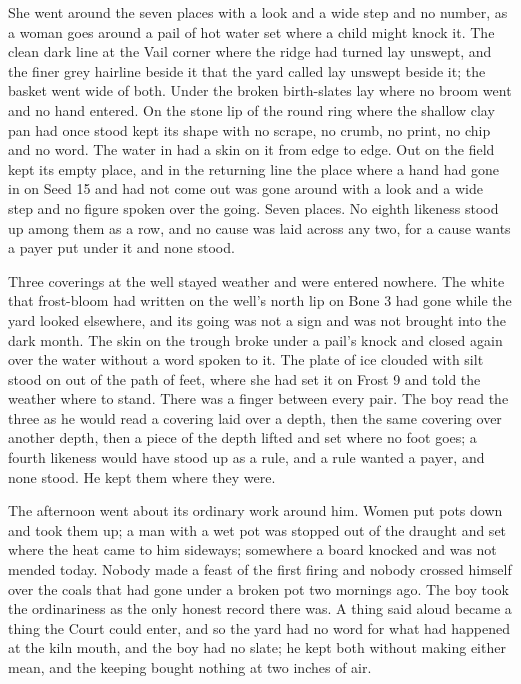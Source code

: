 She went around the seven places with a look and a wide step and no number, as a woman goes around a pail of hot water set where a child might knock it. The clean dark line at the Vail corner where the  ridge had turned lay unswept, and the finer grey hairline beside it that the yard called  lay unswept beside it; the basket went wide of both. Under  the broken birth-slates lay where no broom went and no hand entered. On the stone lip of  the round ring where the shallow clay pan had once stood kept its shape with no scrape, no crumb, no print, no chip and no word. The water in  had a skin on it from edge to edge. Out on  the field kept its empty place, and in the returning line the place where a hand had gone in on Seed 15 and had not come out was gone around with a look and a wide step and no figure spoken over the going. Seven places. No eighth likeness stood up among them as a row, and no cause was laid across any two, for a cause wants a payer put under it and none stood.

Three coverings at the well stayed weather and were entered nowhere. The white that frost-bloom had written on the well's north lip on Bone 3 had gone while the yard looked elsewhere, and its going was not a sign and was not brought into the dark month. The skin on the trough broke under a pail's knock and closed again over the water without a word spoken to it. The plate of ice clouded with silt stood on  out of the path of feet, where she had set it on Frost 9 and told the weather where to stand. There was a finger between every pair. The boy read the three as he would read a covering laid over a depth, then the same covering over another depth, then a piece of the depth lifted and set where no foot goes; a fourth likeness would have stood up as a rule, and a rule wanted a payer, and none stood. He kept them where they were.

The afternoon went about its ordinary work around him. Women put pots down and took them up; a man with a wet pot was stopped out of the draught and set where the heat came to him sideways; somewhere a board knocked and was not mended today. Nobody made a feast of the first firing and nobody crossed himself over the coals that had gone under a broken pot two mornings ago. The boy took the ordinariness as the only honest record there was. A thing said aloud became a thing the Court could enter, and so the yard had no word for what had happened at the kiln mouth, and the boy had no slate; he kept both without making either mean, and the keeping bought nothing at two inches of air.


